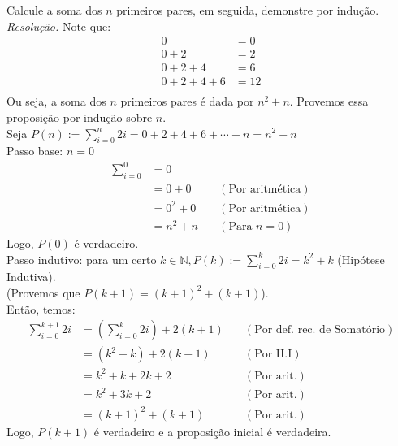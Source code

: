 Calcule a soma dos $n$ primeiros pares, em seguida, demonstre por indução. \\
\emph{Resolução.}
Note que:
\begin{align*}
	0             & = 0  \\
	0 + 2         & = 2  \\
	0 + 2 + 4     & = 6  \\
	0 + 2 + 4 + 6 & = 12 \\
\end{align*}
Ou seja, a soma dos $n$ primeiros pares é dada por $n^2 + n$. Provemos essa proposição por indução sobre $n$. \\
Seja $P(n):= \sum\limits_{i = 0}^{n}2i = 0 + 2 + 4 + 6 + \cdots + n = n^2 + n$ \\
Passo base: $n = 0$
\begin{align*}
	\sum\limits_{i = 0}^{0} & = 0                                      \\
	                        & = 0 + 0   & \quad(\text{Por aritmética}) \\
	                        & = 0^2 + 0 & \quad(\text{Por aritmética}) \\
	                        & = n^2 + n & \quad(\text{Para $n = 0$})
\end{align*}
Logo, $P(0)$ é verdadeiro. \\
Passo indutivo: para um certo $k \in \mathbb{N}, P(k):= \sum\limits_{i = 0}^{k}2i = k^2 + k$ (Hipótese Indutiva). \\
(Provemos que $P(k + 1) = (k + 1)^2 + (k + 1)$). \\
Então, temos:
\begin{align*}
	\sum\limits_{i=0}^{k + 1}2i & = (\sum\limits_{i = 0}^{k}2i) + 2(k + 1) & \quad(\text{Por def. rec. de Somatório}) \\
	                            & = (k^2 + k) + 2(k + 1)                   & \quad(\text{Por H.I})                    \\
	                            & = k^2 + k + 2k + 2                       & \quad(\text{Por arit.})                  \\
	                            & = k^2 + 3k + 2                           & \quad(\text{Por arit.})                  \\
	                            & = (k + 1)^2 + (k + 1)                    & \quad(\text{Por arit.})
\end{align*}
Logo, $P(k + 1)$ é verdadeiro e a proposição inicial é verdadeira.
